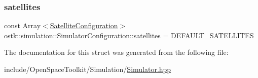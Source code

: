 \subsubsection{\texorpdfstring{satellites}{satellites}}
{\footnotesize\ttfamily const Array$<$\hyperlink{structostk_1_1simulation_1_1_satellite_configuration}{Satellite\+Configuration}$>$ ostk\+::simulation\+::\+Simulator\+Configuration\+::satellites = \hyperlink{_simulator_8hpp_a233d40e3dd62e2ffb9f35a635f34fd36}{D\+E\+F\+A\+U\+L\+T\+\_\+\+S\+A\+T\+E\+L\+L\+I\+T\+ES}}



The documentation for this struct was generated from the following file\+:\begin{DoxyCompactItemize}
\item 
include/\+Open\+Space\+Toolkit/\+Simulation/\hyperlink{_simulator_8hpp}{Simulator.\+hpp}\end{DoxyCompactItemize}
